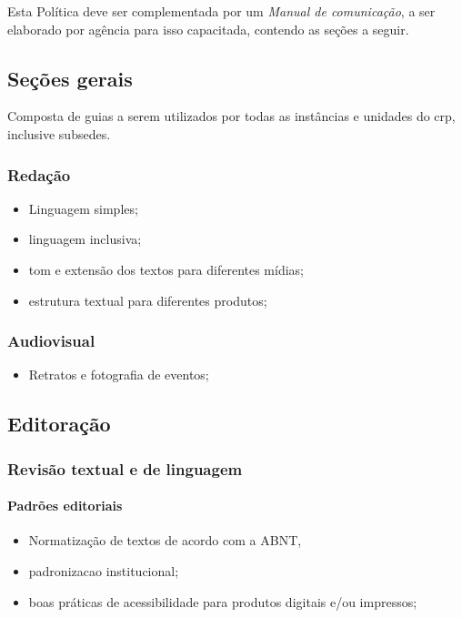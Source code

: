 Esta Política deve ser complementada por um \emph{Manual de comunicação}, a ser elaborado por agência para isso capacitada, contendo as seções a seguir.

\subsection{Seções gerais}

Composta de guias a serem utilizados por todas as instâncias e unidades do \ac{crp}, inclusive subsedes.

\subsubsection{Redação}

\begin{itemize}
	\item
	Linguagem simples;
	\item
	linguagem inclusiva;
	\item
	tom e extensão dos textos para diferentes mídias;
	\item
	estrutura textual para diferentes produtos;
\end{itemize}

\subsubsection{Audiovisual}

\begin{itemize}
	\item
	Retratos e fotografia de eventos;
\end{itemize}

\subsection{Editoração}

\subsubsection{Revisão textual e de linguagem}

\paragraph{Padrões editoriais}

\begin{itemize}
	\item
	Normatização de textos de acordo com a ABNT,
	\item
	\gls{padronizacao} institucional;
	\item
	boas práticas de acessibilidade para produtos digitais e/ou impressos;
\end{itemize}

